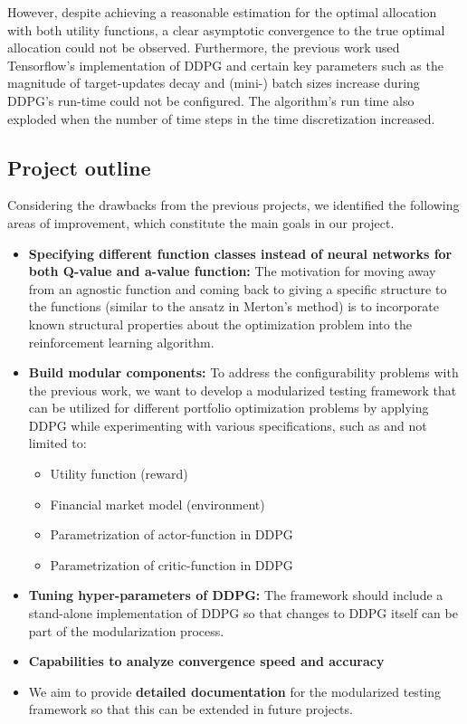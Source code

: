However, despite achieving a reasonable estimation for the optimal allocation with both utility functions, a clear asymptotic convergence to the true optimal allocation could not be observed. Furthermore, the previous work used Tensorflow's \cite{tensorflow2015-whitepaper} implementation of DDPG and certain key parameters such as 
the magnitude of target-updates decay and (mini-) batch sizes increase during
DDPG’s run-time could not be configured. The algorithm's run time also exploded when the number of time steps in the time discretization increased.



\subsection{Project outline}
Considering the drawbacks from the previous projects, we identified the following areas of improvement, which constitute the main goals in our project.
\begin{itemize}
    \item \textbf{Specifying different function classes instead of neural networks for both Q-value and a-value function:} The motivation for moving away from an agnostic function and coming back to giving a specific structure to the functions (similar to the ansatz in Merton's method) is to incorporate known structural properties about the optimization problem into the reinforcement learning algorithm.
    \item \textbf{Build modular components:} To address the configurability problems with the previous work, we want to develop a modularized testing framework that can be utilized for different portfolio optimization problems by applying DDPG while experimenting with various specifications, such as and not limited to:
    \begin{itemize}
        \item Utility function (reward)
        \item Financial market model (environment)
        \item Parametrization of actor-function in DDPG
        \item Parametrization of critic-function in DDPG
    \end{itemize}
    \item \textbf{Tuning hyper-parameters of DDPG:}
        The framework should include a stand-alone implementation of DDPG so that changes to DDPG itself can be part of the modularization process.
    \item \textbf{Capabilities to analyze convergence speed and accuracy} 
    \item We aim to provide \textbf{detailed documentation} for the modularized testing framework so that this can be extended in future projects.
\end{itemize}




